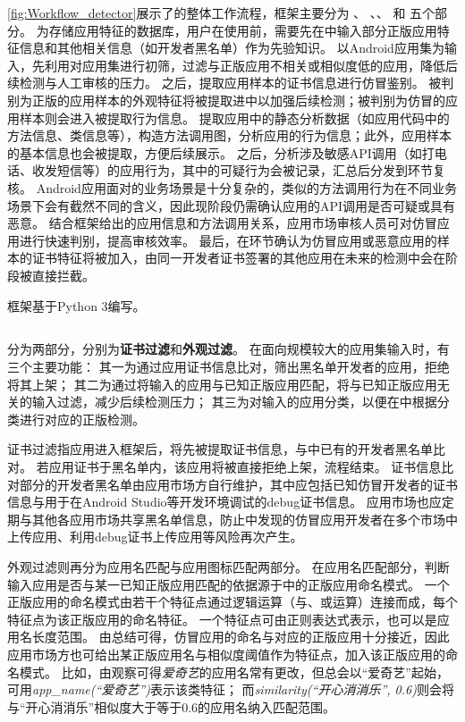 \autoref{fig:Workflow_detector}展示了\mytool 的整体工作流程，框架主要分为\textbf{\componentA} 、\textbf{\componentB} 、\textbf{\componentC}、\textbf{\componentD} 和\textbf{\componentE} 五个部分。
\componentE 为存储应用特征的数据库，用户在使用前，需要先在\componentE 中输入部分正版应用特征信息和其他相关信息（如开发者黑名单）作为先验知识。
\mytool 以Android应用集为输入，先利用\componentA 对应用集进行初筛，过滤与正版应用不相关或相似度低的应用，降低后续检测与人工审核的压力。
之后，\componentB 提取应用样本的证书信息进行仿冒鉴别。
被判别为正版的应用样本的外观特征将被提取进\componentE 中以加强后续检测；被判别为仿冒的应用样本则会进入\componentC 被提取行为信息。
\componentC 提取应用中的静态分析数据（如应用代码中的方法信息、类信息等），构造方法调用图，分析应用的行为信息；此外，应用样本的基本信息也会被提取，方便后续展示。
之后，\componentC 分析涉及敏感API调用（如打电话、收发短信等）的应用行为，其中的可疑行为会被记录，汇总后分发到\componentD 环节复核。
Android应用面对的业务场景是十分复杂的，类似的方法调用行为在不同业务场景下会有截然不同的含义，因此现阶段仍需\componentD 确认应用的API调用是否可疑或具有恶意。
结合框架给出的应用信息和方法调用关系，应用市场审核人员可对仿冒应用进行快速判别，提高审核效率。
最后，在\componentD 环节确认为仿冒应用或恶意应用的样本的证书特征将被加入\componentE ，由同一开发者证书签署的其他应用在未来的检测中会在\componentA 阶段被直接拦截。

框架基于Python 3编写。

\subsection{\componentA }
\componentA 分为两部分，分别为\textbf{证书过滤}和\textbf{外观过滤}。
在面向规模较大的应用集输入时，\componentA 有三个主要功能：
其一为通过应用证书信息比对，筛出黑名单开发者的应用，拒绝将其上架；
其二为通过将输入的应用与已知正版应用匹配，将与已知正版应用无关的输入过滤，减少后续检测压力；
其三为对输入的应用分类，以便在\componentB 中根据分类进行对应的正版检测。

证书过滤指应用进入框架后，将先被提取证书信息，与\componentE 中已有的开发者黑名单比对。
若应用证书于黑名单内，该应用将被直接拒绝上架，流程结束。
证书信息比对部分的开发者黑名单由应用市场方自行维护，其中应包括已知仿冒开发者的证书信息与用于在Android Studio等开发环境调试的debug证书信息。
应用市场也应定期与其他各应用市场共享黑名单信息，防止中发现的仿冒应用开发者在多个市场中上传应用、利用debug证书上传应用等风险再次产生。

外观过滤则再分为应用名匹配与应用图标匹配两部分。
在应用名匹配部分，判断输入应用是否与某一已知正版应用匹配的依据源于\componentD 中的正版应用命名模式。
一个正版应用的命名模式由若干个特征点通过逻辑运算（与、或运算）连接而成，每个特征点为该正版应用的命名特征。
一个特征点可由正则表达式表示，也可以是应用名长度范围。
由总结可得，仿冒应用的命名与对应的正版应用十分接近，因此应用市场方也可给出某正版应用名与相似度阈值作为特征点，加入该正版应用的命名模式。
比如，由观察可得\textit{爱奇艺}的应用名常有更改，但总会以``爱奇艺''起始，可用\textit{app\_name(``爱奇艺\*'')}表示该类特征；
而\textit{similarity(``开心消消乐'', 0.6)}则会将与``开心消消乐''相似度大于等于0.6的应用名纳入匹配范围。

